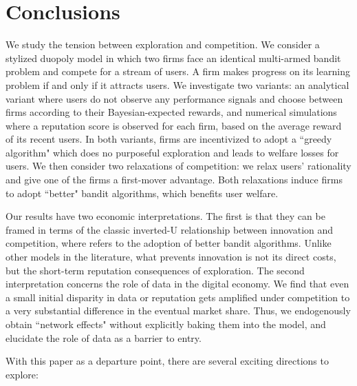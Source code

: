 \documentclass[../competing_bandits.tex]{subfiles}
\begin{document}
\section{Conclusions}\label{sec:conclusion}

We study the tension between exploration and competition. We consider a stylized duopoly model in which two firms face an identical multi-armed bandit problem and compete for a stream of users. A firm makes progress on its learning problem if and only if it attracts users. We investigate two variants: an analytical variant where users do not observe any performance signals and choose between firms according to their Bayesian-expected rewards, and numerical simulations where a reputation score is observed for each firm, based on the average reward of its recent users.  In both variants, firms are incentivized to adopt a ``greedy algorithm" which does no purposeful exploration and leads to welfare losses for users. We then consider two relaxations of competition: we relax users' rationality and give one of the firms a first-mover advantage. Both relaxations induce firms to adopt ``better" bandit algorithms, which benefits user welfare.


Our results have two economic interpretations. The first is that they can be framed in terms of the classic inverted-U relationship between innovation and competition, where \innovation refers to the adoption of better bandit algorithms. Unlike other models in the literature, what prevents innovation is not its direct costs, but the short-term reputation consequences of exploration. The second interpretation concerns the role of data in the digital economy. We find that even a small initial disparity in data or reputation gets amplified under competition to a very substantial difference in the eventual market share. Thus, we endogenously obtain ``network effects" without explicitly baking them into the model, and elucidate the role of data as a barrier to entry.

With this paper as a departure point, there are several exciting directions to explore:
\end{document}
